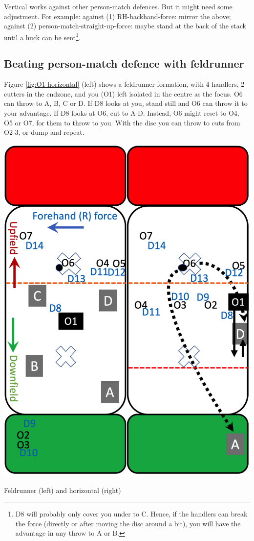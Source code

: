 \documentclass{tufte-handout}
\begin{document}
Vertical works
against other person-match defences. 
But it might need 
some adjustment.
For example:
against (1) RH-backhand-force: mirror the above;
against (2) person-match-straight-up-force:  
maybe
stand at the back of the stack
until a huck can be sent\footnote{
D8 
will probably 
only cover you under 
to C.
Hence, 
if the handlers 
can break the force 
(directly 
or after moving the disc around a bit), 
you will have the advantage 
in any throw to A 
or B.}.


\subsection{Beating person-match defence with feldrunner}
\label{sec:feld}
Figure \ref{fig:O1-horizontal} (left) 
shows a feldrunner formation, 
with 4 handlers, 
2 cutters 
in the endzone,
and you 
(O1) 
left  
isolated 
in the centre
as the focus. 
O6 can throw 
to A,
B, 
C 
or D. 
If D8 looks at you, 
stand still and 
O6 can throw it 
to your advantage. 
If D8
looks at O6, 
cut to A-D. 
Instead, 
O6 might reset 
to O4, O5 or O7, 
for them to 
throw to you. 
With the disc 
you can throw
to cuts from O2-3, 
or dump and repeat. 

\begin{marginfigure}%
  \includegraphics[width=\linewidth]{O1-horizontal}
  \caption{Feldrunner (left) and horizontal (right)}
  \label{fig:O1-horizontal}
\end{marginfigure}
\end{document}
